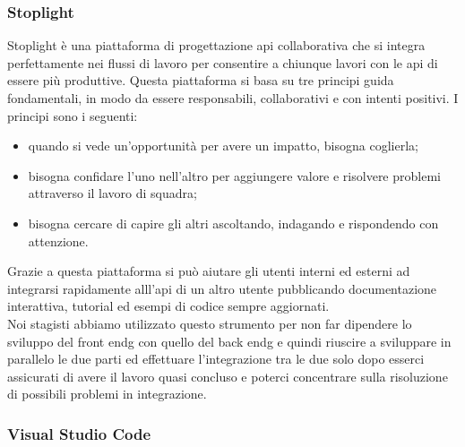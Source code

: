 \subsubsection{Stoplight}
\label{subsubsec:stoplight}

Stoplight è una piattaforma di progettazione \gls{api} collaborativa che si integra perfettamente nei flussi di lavoro per consentire a chiunque lavori con le \gls{api} di essere più produttive. Questa piattaforma si basa su tre principi guida fondamentali, in modo da essere responsabili, collaborativi e con intenti positivi. I principi sono i seguenti:
\begin{itemize}
	\item quando si vede un'opportunità per avere un impatto, bisogna coglierla;
	\item bisogna confidare l'uno nell'altro per aggiungere valore e risolvere problemi attraverso il lavoro di squadra;
	\item bisogna cercare di capire gli altri ascoltando, indagando e rispondendo con attenzione.
\end{itemize}
Grazie a questa piattaforma si può aiutare gli utenti interni ed esterni ad integrarsi rapidamente alll'\gls{api} di un altro utente pubblicando documentazione interattiva, tutorial ed esempi di codice sempre aggiornati.\\
Noi stagisti abbiamo utilizzato questo strumento per non far dipendere lo sviluppo del \gls{front endg} con quello del \gls{back endg} e quindi riuscire a sviluppare in parallelo le due parti ed effettuare l'integrazione tra le due solo dopo esserci assicurati di avere il lavoro quasi concluso e poterci concentrare sulla risoluzione di possibili problemi in integrazione.

\subsubsection{Visual Studio Code}
\label{subsubsec:visual-studio-code}


